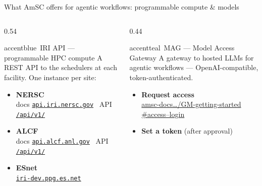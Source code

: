 \documentclass[aspectratio=169,11pt]{beamer}
\begin{document}
\begin{frame}{What AmSC offers for agentic workflows: programmable compute \& models}
  \begin{columns}[t, totalwidth=\textwidth]
    \begin{column}{0.54\textwidth}
      \begin{featbox}{accentblue}{\faPlug\ IRI API — programmable HPC compute}
        \footnotesize
        A REST API to the schedulers at each facility. One instance per site:
        \vspace{4pt}
        \begin{itemize}\setlength\itemsep{4pt}
          \item[\faServer] \textbf{NERSC}\\
            {\scriptsize docs \href{https://api.iri.nersc.gov}{\texttt{api.iri.nersc.gov}}
             \textperiodcentered\ API \href{https://api.iri.nersc.gov/api/v1/}{\texttt{/api/v1/}}}
          \item[\faServer] \textbf{ALCF}\\
            {\scriptsize docs \href{https://api.alcf.anl.gov}{\texttt{api.alcf.anl.gov}}
             \textperiodcentered\ API \href{https://api.alcf.anl.gov/api/v1/}{\texttt{/api/v1/}}}
          \item[\faServer] \textbf{ESnet}\\
            {\scriptsize \href{https://iri-dev.ppg.es.net}{\texttt{iri-dev.ppg.es.net}}}
        \end{itemize}
      \end{featbox}
    \end{column}
    \begin{column}{0.44\textwidth}
      \begin{featbox}{accentteal}{\faBrain\ MAG — Model Access Gateway}
        \footnotesize
        A gateway to hosted LLMs for agentic workflows — OpenAI-compatible,
        token-authenticated.
        \vspace{4pt}
        \begin{itemize}\setlength\itemsep{5pt}
          \item[\faUserPlus] \textbf{Request access}\\
            {\scriptsize\href{https://amsc-docs-d762d2.gitlab.io/GM-getting-started/\#access--login}{amsc-docs\ldots/GM-getting-started \#access--login}}
          \item[\faKey] \textbf{Set a token} (after approval)\\

\end{itemize}
\end{featbox}
\end{column}
\end{columns}
\end{frame}
\end{document}
